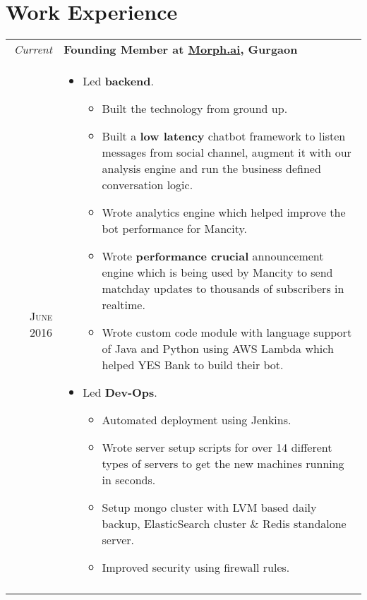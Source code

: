 \documentclass[a4paper,10pt]{article}
\begin{document}
\section{Work Experience}
\begin{tabular}{r|p{16cm}}
 \emph{Current} & \textbf{Founding Member at \href{http://www.morph.ai}{Morph.ai}, Gurgaon} \\\textsc{June 2016}&
 \begin{itemize}[noitemsep]
 \item Led \textbf{backend}.
 \begin{itemize}[noitemsep]
 \item Built the technology from ground up.
 \item Built a \textbf{low latency} chatbot framework to listen messages from social channel, augment it with our analysis engine and run the business defined conversation logic.
 \item Wrote analytics engine which helped improve the bot performance for Mancity.
 \item Wrote \textbf{performance crucial} announcement engine which is being used by Mancity to send matchday updates to thousands of subscribers in realtime.
 \item Wrote custom code module with language support of Java and Python using AWS Lambda which helped YES Bank to build their bot.
 \end{itemize}

 \item Led \textbf{Dev-Ops}.
 \begin{itemize}[noitemsep]
 \item Automated deployment using Jenkins.
 \item Wrote server setup scripts for over 14 different types of servers to get the new machines running in seconds.
 \item Setup mongo cluster with LVM based daily backup, ElasticSearch cluster \& Redis standalone server.
 \item Improved security using firewall rules.
 \end{itemize}
 \end{itemize}\\\multicolumn{2}{c}{} \\


\end{tabular}
\end{document}
